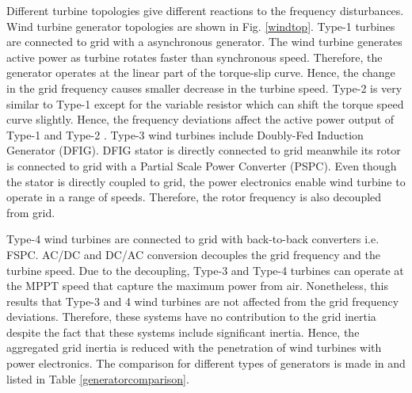 Different turbine topologies give different reactions to the frequency disturbances. Wind turbine generator topologies are shown in Fig. \ref{windtop}. Type-1 turbines are connected to grid with a asynchronous generator. The wind turbine generates active power as turbine rotates faster than synchronous speed. Therefore, the generator operates at the linear part of the torque-slip curve. Hence, the change in the grid frequency causes smaller decrease in the turbine speed. Type-2 is very similar to Type-1 except for the variable resistor which can shift the torque speed curve slightly. Hence, the frequency deviations affect the active power output of Type-1 and Type-2 \cite{Muljadi2012}. Type-3 wind turbines include Doubly-Fed Induction Generator (DFIG). DFIG stator is directly connected to grid meanwhile its rotor is connected to grid with a Partial Scale Power Converter (PSPC). Even though the stator is directly coupled to grid, the power electronics enable wind turbine to operate in a range of speeds. Therefore, the rotor frequency is also decoupled from grid.\par Type-4 wind turbines are connected to grid with back-to-back converters i.e. FSPC. AC/DC and DC/AC conversion decouples the grid frequency and the turbine speed. Due to the decoupling, Type-3 and Type-4 turbines can operate at the MPPT speed that capture the maximum power from air. Nonetheless, this results that Type-3 and 4 wind turbines are not affected from the grid frequency deviations. Therefore, these systems have no contribution to the grid inertia despite the fact that these systems include significant inertia. Hence, the aggregated grid inertia is reduced with the penetration of wind turbines with power electronics. The comparison for different types of generators is made in \cite{VanDeVyver2016} and listed in Table \ref{generatorcomparison}.\par  
